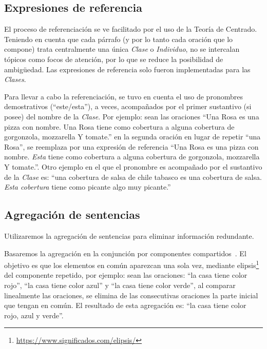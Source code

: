 \subsection{Expresiones de referencia}
El proceso de referenciación se ve facilitado por el uso de la Teoría de Centrado. 
Teniendo en cuenta que cada párrafo (y por lo tanto cada oración que lo compone) trata centralmente una única \textit{Clase }o \textit{Individuo}, no se intercalan tópicos como focos de atención, por lo que se reduce la posibilidad de ambigüedad. Las expresiones de referencia solo fueron implementadas para las \textit{Clases}.

Para llevar a cabo la referenciación, se tuvo en cuenta el uso de pronombres demostrativos (``este/esta''), a veces, acompañados por el primer sustantivo (si posee) del nombre de la \textit{Clase}. Por ejemplo: sean las oraciones ``Una Rosa es una pizza con nombre. Una Rosa tiene como cobertura a alguna cobertura de gorgonzola, mozzarella Y tomate.'' en la segunda oración en lugar de repetir ``una Rosa'', se reemplaza por una expresión de referencia ``Una Rosa es una pizza con nombre. \emph{Esta} tiene como cobertura a alguna cobertura de gorgonzola, mozzarella Y tomate.''. Otro ejemplo en el que el pronombre es acompañado por el sustantivo de la \textit{Clase} es: ``una cobertura de salsa de chile tabasco es una cobertura de salsa. \emph{Esta cobertura} tiene como picante algo muy picante.''


\subsection{Agregación de sentencias}
Utilizaremos la agregación de sentencias para eliminar información redundante.

Basaremos la agregación en la conjunción por componentes compartidos~\cite{bernardos2003marco}. El objetivo es que los elementos en común aparezcan una sola vez, mediante elipsis\footnote{\url{https://www.significados.com/elipsis/}} del componente repetido, por ejemplo: sean las oraciones: ``la casa tiene color rojo'', ``la casa tiene color azul'' y ``la casa tiene color verde'', al comparar linealmente las oraciones, se elimina de las consecutivas oraciones la parte inicial que tengan en común. El resultado de esta agregación es: ``la casa tiene color rojo, azul y verde''.

